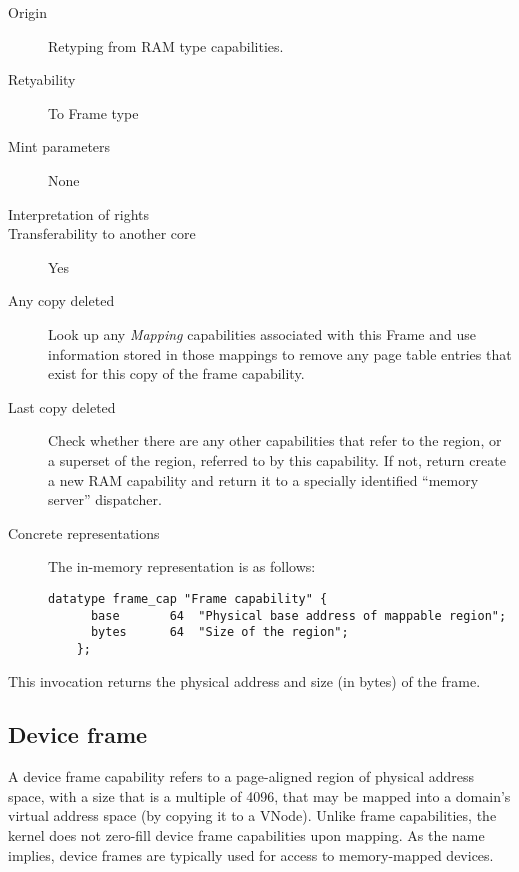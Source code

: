 \begin{description}
\item[Origin] Retyping from RAM type capabilities.
  
\item[Retyability] To Frame type
  
\item[Mint parameters] None
  
\item[Interpretation of rights] 
  
\item[Transferability to another core] Yes

\item[Any copy deleted] Look up any \emph{Mapping} capabilities associated
  with this Frame and use information stored in those mappings to remove any
  page table entries that exist for this copy of the frame capability.

\item[Last copy deleted] Check whether there are any other capabilities that
  refer to the region, or a superset of the region, referred to by this
    capability. If not, return create a new RAM capability and return it to a
    specially identified ``memory server'' dispatcher.
  
\item[Concrete representations] The in-memory representation is as follows:
  
  \begin{lstlisting}[language=Mackerel]
    datatype frame_cap "Frame capability" {
      base       64  "Physical base address of mappable region";
      bytes      64  "Size of the region";
    };
  \end{lstlisting}
\end{description}  

This invocation returns the physical address and size (in bytes) of the frame.

\subsection{Device frame}
A device frame capability refers to a page-aligned region of physical address
space, with a size that is a multiple of 4096, that may be mapped into a
domain's virtual address space (by copying it to a VNode).
Unlike frame capabilities, the kernel does not zero-fill device frame
capabilities upon mapping.
As the name implies, device frames are typically used for access to
memory-mapped devices.

